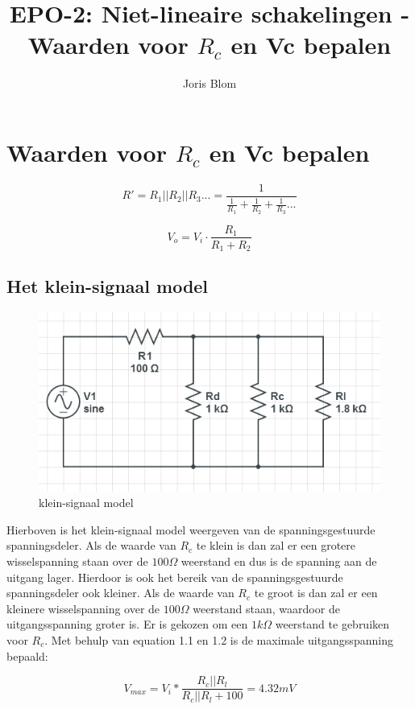 \documentclass{report}
\title{EPO-2: Niet-lineaire schakelingen - Waarden voor $R_c$ en Vc bepalen}
\author{Joris Blom}
\begin{document}
\chapter{Waarden voor $R_c$ en Vc bepalen}
\label{ch:Waarden voor $R_c$ en Vc bepalen}

\begin{equation}
R' = R_1||R_2||R_3... = \frac{1}{\frac{1}{R_1}+\frac{1}{R_2}+\frac{1}{R_3}...}
\end{equation}

\begin{equation}
V_o =V_i\cdot \frac{R_1}{R_1+R_2}
\end{equation}

\section{Het klein-signaal model}
\label{ch:Het klein-signaal model}
\begin{figure}[h]
\centering
\includegraphics{Small-signal-model.PNG}

\caption{klein-signaal model}
\end{figure}
Hierboven is het klein-signaal model weergeven van de spanningsgestuurde spanningsdeler. Als de waarde van $R_c$ te klein is dan zal er een grotere wisselspanning staan over de $100\Omega$ weerstand en dus is de spanning aan de uitgang lager. Hierdoor is ook het bereik van de spanningsgestuurde spanningsdeler ook kleiner. Als de waarde van $R_c$ te groot is dan zal er een kleinere wisselspanning over de $100\Omega$ weerstand staan, waardoor de uitgangsspanning groter is. Er is gekozen om een $1k\Omega$ weerstand te gebruiken voor $R_c$. Met behulp van equation 1.1 en 1.2 is de maximale uitgangsspanning bepaald:

$$V_{max} = V_i * \frac{R_c||R_l}{R_c||R_l + 100} = 4.32 mV$$
\end{document}
